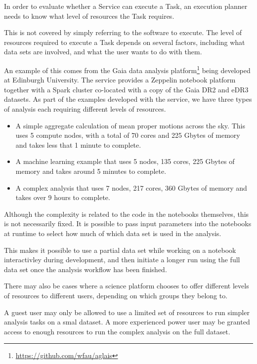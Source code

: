 \documentclass[11pt,a4paper]{ivoa}
\newcommand{\footurl}[1] {\footnote{\url{#1}}}
\newcommand{\dataset} {dataset\xspace}
\begin{document}
In order to evaluate whether a Service can execute a Task, an execution planner needs to know what level of resources the Task requires.

This is not covered by simply referring to the software to execute.
The level of resources required to execute a Task depends on several factors,
including what data sets are involved, and what the user wants to do with them.

An example of this comes from the Gaia data analysis platform\footurl{https://github.com/wfau/aglais} being developed at Edinburgh University.
The service provides a Zeppelin notebook platform together with a Spark cluster co-located with a copy of the Gaia DR2 and eDR3 datasets.
As part of the examples developed with the service, we have three types of analysis each requiring different levels of resources.

\begin{itemize}
    \item A simple aggregate calculation of mean proper motions across the sky.
    This uses 5 compute nodes, with a total of 70 cores and 225 Gbytes of memory
    and takes less that 1 minute to complete.
    \item A machine learning example that uses 5 nodes, 135 cores, 225 Gbytes of memory
    and takes around 5 minutes to complete.
    \item A complex analysis that uses 7 nodes, 217 cores, 360 Gbytes of memory
    and takes over 9 hours to complete.
\end{itemize}

Although the complexity is related to the code in the notebooks themselves, this is not necessarily fixed.
It is possible to pass input parameters into the notebooks at runtime to select how much of which data set is used in the analysis.

This makes it possible to use a partial data set while working on a notebook interactivley during development,
and then initiate a longer run using the full data set once the analysis workflow has been finished.

There may also be cases where a science platform chooses to offer different levels of resources to different users,
depending on which groups they belong to.

A guest user may only be allowed to use a limited set of resources to run simpler analysis tasks on a smal \dataset.
A more experienced power user may be granted access to enough resources to run
the complex analysis on the full dataset.
\end{document}
